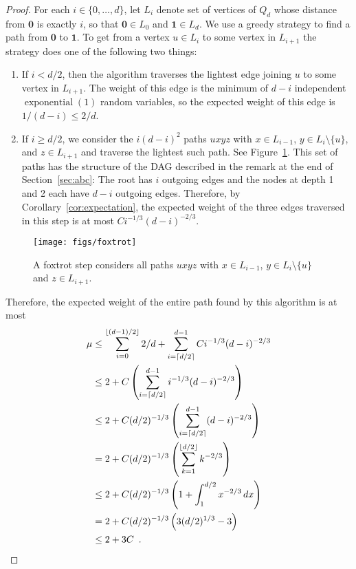 \documentclass[a4paper,UKenglish]{lipics-v2016}
\DeclareMathOperator{\exponential}{exponential}
\newcommand{\zero}{\mathbf{0}}
\newcommand{\one}{\mathbf{1}}
\begin{document}
\begin{proof}
  For each $i\in\{0,\ldots,d\}$, let $L_i$ denote set of vertices of $Q_d$
  whose distance from $\zero$ is exactly $i$, so that $\zero\in L_0$ and
  $\one\in L_d$.  We use a greedy strategy to find a path from $\zero$
  to $\one$.  To get from a vertex $u\in L_i$ to some vertex in $L_{i+1}$
  the strategy does one of the following two things:
  \begin{enumerate}
     \item If $i < d/2$, then the algorithm traverses the lightest edge
     joining $u$ to some vertex in $L_{i+1}$.  The weight of this edge is
     the minimum of $d-i$ independent $\exponential(1)$ random variables,
     so the expected weight of this edge is $1/(d-i)\le 2/d$.

     \item If $i \ge d/2$, we consider the $i(d-i)^2$ paths $uxyz$ with
     $x\in L_{i-1}$, $y\in L_i\setminus\{u\}$, and $z\in L_{i+1}$ and
     traverse the lightest such path.  See Figure~\ref{fig:foxtrot}. This
     set of paths has the structure of the DAG described in the
     remark at the end of Section~\ref{sec:abc}:  The root has $i$
     outgoing edges and the nodes at depth 1 and 2 each have $d-i$
     outgoing edges.  Therefore, by Corollary~\ref{cor:expectation},
     the expected weight of the three edges traversed in this step is
     at most $Ci^{-1/3}(d-i)^{-2/3}$.
  \end{enumerate}
  \begin{figure}
    \begin{center}
       \texttt{[image: figs/foxtrot]}
    \end{center}
    \caption{A foxtrot step considers all paths $uxyz$ with $x\in L_{i-1}$, $y\in L_i\setminus\{u\}$ and $z\in L_{i+1}$.}
    \label{fig:foxtrot}
  \end{figure}
  Therefore, the expected weight of the entire path found by this
  algorithm is at most
  \begin{align*}
    \mu & \le \sum_{i=0}^{\lfloor (d-1)/2\rfloor} 2/d 
               + \sum_{i=\lceil d/2\rceil}^{d-1} Ci^{-1/3}(d-i)^{-2/3} \\
        & \le 2 
               + C\left(\sum_{i=\lceil d/2\rceil}^{d-1} i^{-1/3}(d-i)^{-2/3}\right) \\
        & \le 2 
               + C(d/2)^{-1/3}\left(\sum_{i=\lceil d/2\rceil}^{d-1} (d-i)^{-2/3}\right) \\
        & = 2 
               + C(d/2)^{-1/3}\left(\sum_{k=1}^{\lfloor d/2\rfloor}k^{-2/3}\right) \\
        & \le 2
               + C(d/2)^{-1/3}\left(1+\int_1^{d/2}x^{-2/3}\,dx\right) \\
        & = 2
               + C(d/2)^{-1/3}\left(3(d/2)^{1/3}-3\right) \\
        & \le 2
               + 3C \enspace . \qedhere
  \end{align*}
\end{proof}
\end{document}
